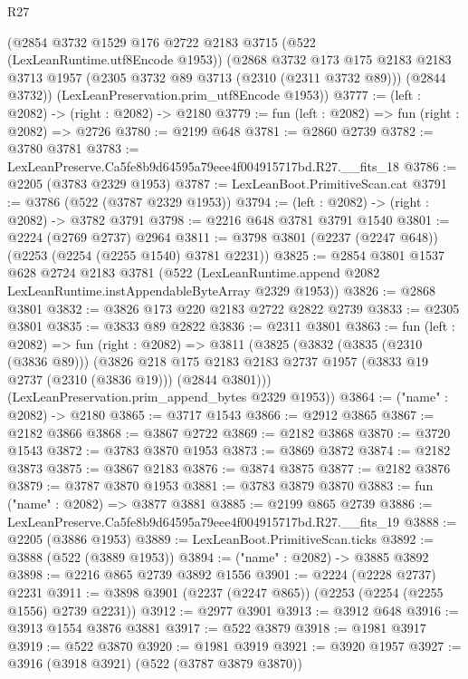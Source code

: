 \begin{lexlean}{R27}
\begin{coremodule}
    (@2854
      @3732
      @1529
      @176
      @2722
      @2183
      @3715
      (@522 (LexLeanRuntime.utf8Encode @1953))
      (@2868
        @3732
        @173
        @175
        @2183
        @2183
        @3713
        @1957
        (@2305 @3732 @89 @3713 (@2310 (@2311 @3732 @89)))
        (@2844 @3732))
      (LexLeanPreservation.prim_utf8Encode @1953))
@3777 := (left : @2082) -> (right : @2082) -> @2180
@3779 := fun (left : @2082) => fun (right : @2082) => @2726
@3780 := @2199 @648
@3781 := @2860 @2739
@3782 := @3780 @3781
@3783 := LexLeanPreserve.Ca5fe8b9d64595a79eee4f004915717bd.R27.__fits_18
@3786 := @2205 (@3783 @2329 @1953)
@3787 := LexLeanBoot.PrimitiveScan.cat
@3791 := @3786 (@522 (@3787 @2329 @1953))
@3794 := (left : @2082) -> (right : @2082) -> @3782 @3791
@3798 := @2216 @648 @3781 @3791 @1540
@3801 := @2224 (@2769 @2737) @2964
@3811 := @3798 @3801 (@2237 (@2247 @648)) (@2253 (@2254 (@2255 @1540) @3781 @2231))
@3825 := @2854
    @3801
    @1537
    @628
    @2724
    @2183
    @3781
    (@522 (LexLeanRuntime.append @2082 LexLeanRuntime.instAppendableByteArray @2329 @1953))
@3826 := @2868 @3801
@3832 := @3826 @173 @220 @2183 @2722 @2822 @2739
@3833 := @2305 @3801
@3835 := @3833 @89 @2822
@3836 := @2311 @3801
@3863 := fun (left : @2082) =>
  fun (right : @2082) =>
  @3811
    (@3825
      (@3832
        (@3835 (@2310 (@3836 @89)))
        (@3826
          @218
          @175
          @2183
          @2183
          @2737
          @1957
          (@3833 @19 @2737 (@2310 (@3836 @19)))
          (@2844 @3801)))
      (LexLeanPreservation.prim_append_bytes @2329 @1953))
@3864 := ("name" : @2082) -> @2180
@3865 := @3717 @1543
@3866 := @2912 @3865
@3867 := @2182 @3866
@3868 := @3867 @2722
@3869 := @2182 @3868
@3870 := @3720 @1543
@3872 := @3783 @3870 @1953
@3873 := @3869 @3872
@3874 := @2182 @3873
@3875 := @3867 @2183
@3876 := @3874 @3875
@3877 := @2182 @3876
@3879 := @3787 @3870 @1953
@3881 := @3783 @3879 @3870
@3883 := fun ("name" : @2082) => @3877 @3881
@3885 := @2199 @865 @2739
@3886 := LexLeanPreserve.Ca5fe8b9d64595a79eee4f004915717bd.R27.__fits_19
@3888 := @2205 (@3886 @1953)
@3889 := LexLeanBoot.PrimitiveScan.ticks
@3892 := @3888 (@522 (@3889 @1953))
@3894 := ("name" : @2082) -> @3885 @3892
@3898 := @2216 @865 @2739 @3892 @1556
@3901 := @2224 (@2228 @2737) @2231
@3911 := @3898 @3901 (@2237 (@2247 @865)) (@2253 (@2254 (@2255 @1556) @2739 @2231))
@3912 := @2977 @3901
@3913 := @3912 @648
@3916 := @3913 @1554 @3876 @3881
@3917 := @522 @3879
@3918 := @1981 @3917
@3919 := @522 @3870
@3920 := @1981 @3919
@3921 := @3920 @1957
@3927 := @3916 (@3918 @3921) (@522 (@3787 @3879 @3870))

\end{coremodule}
\end{lexlean}
